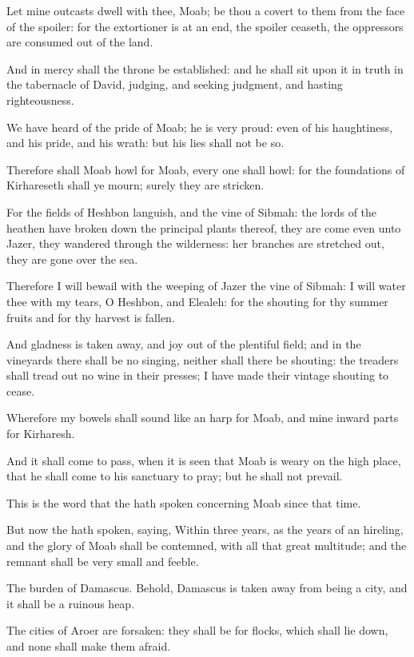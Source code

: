 \Verse Let mine outcasts dwell with thee, Moab; be thou a covert to them from the face of the spoiler: for the extortioner is at an end, the spoiler ceaseth, the oppressors are consumed out of the land.

\Verse And in mercy shall the throne be established: and he shall sit upon it in truth in the tabernacle of David, judging, and seeking judgment, and hasting righteousness.

\Verse We have heard of the pride of Moab; he is very proud: even of his haughtiness, and his pride, and his wrath: but his lies shall not be so.

\Verse Therefore shall Moab howl for Moab, every one shall howl: for the foundations of Kirhareseth shall ye mourn; surely they are stricken.

\Verse For the fields of Heshbon languish, and the vine of Sibmah: the lords of the heathen have broken down the principal plants thereof, they are come even unto Jazer, they wandered through the wilderness: her branches are stretched out, they are gone over the sea.

\Verse Therefore I will bewail with the weeping of Jazer the vine of Sibmah: I will water thee with my tears, O Heshbon, and Elealeh: for the shouting for thy summer fruits and for thy harvest is fallen.

\Verse And gladness is taken away, and joy out of the plentiful field; and in the vineyards there shall be no singing, neither shall there be shouting: the treaders shall tread out no wine in their presses; I have made their vintage shouting to cease.

\Verse Wherefore my bowels shall sound like an harp for Moab, and mine inward parts for Kirharesh.

\Verse And it shall come to pass, when it is seen that Moab is weary on the high place, that he shall come to his sanctuary to pray; but he shall not prevail.

\Verse This is the word that the \LORD hath spoken concerning Moab since that time.

\Verse But now the \LORD hath spoken, saying, Within three years, as the years of an hireling, and the glory of Moab shall be contemned, with all that great multitude; and the remnant shall be very small and feeble.


\Chapter
\Verse The burden of Damascus. Behold, Damascus is taken away from being a city, and it shall be a ruinous heap.

\Verse The cities of Aroer are forsaken: they shall be for flocks, which shall lie down, and none shall make them afraid.

